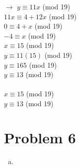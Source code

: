 \documentclass[11pt,letterpaper]{article}
\begin{document}
\begin{enumerate}[(a)]
$\rightarrow$ $y\equiv11x$ (mod 19)\\
$11x\equiv4+12x$ (mod 19)\\
$0\equiv4+x$ (mod 19)\\
$-4\equiv x$ (mod 19)\\
$x\equiv 15$ (mod 19)\\
$y\equiv11(15)$ (mod 19)\\
$y\equiv165$ (mod 19)\\
$y\equiv13$ (mod 19)\\
\\
$x\equiv 15$ (mod 19)\\
$y\equiv13$ (mod 19)\\

\end{enumerate}
\clearpage

\section*{Problem 6}
\begin{enumerate}[(a)]
\item

\end{enumerate}
\end{document}
